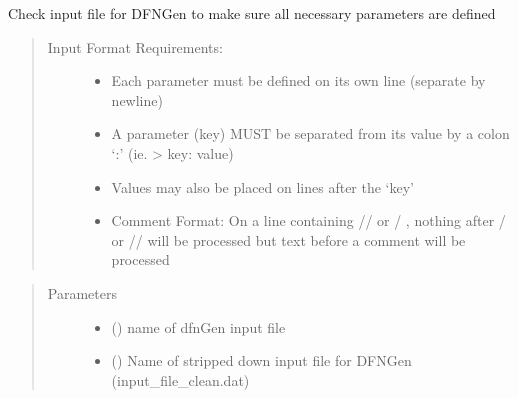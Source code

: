 \documentclass[letterpaper,10pt,english]{sphinxmanual}
\begin{document}
\begin{fulllineitems}

\begin{fulllineitems}
\label{\detokenize{pydfnworks:pydfnworks.general.dfnworks.DFNWORKS.check_input}}
Check input file for DFNGen to make sure all necessary parameters are defined
\begin{quote}
\begin{description}
\item[{Input Format Requirements:}] \leavevmode\begin{itemize}
\item {} 
Each parameter must be defined on its own line (separate by newline)

\item {} 
A parameter (key) MUST be separated from its value by a colon ‘:’ (ie. \textendash{}\textgreater{} key: value)

\item {} 
Values may also be placed on lines after the ‘key’

\item {} 
Comment Format:  On a line containing  // or / \sphinxcode{\sphinxupquote{*}}, nothing after \sphinxcode{\sphinxupquote{*}} / or // will be processed  but text before a comment will be processed

\end{itemize}

\end{description}
\end{quote}
\begin{quote}\begin{description}
\item[{Parameters}] \leavevmode\begin{itemize}
\item {} 
 () \textendash{} name of dfnGen input file

\item {} 
 () \textendash{} Name of stripped down input file for DFNGen (input\_file\_clean.dat)

\end{itemize}


\end{description}
\end{quote}
\end{fulllineitems}
\end{fulllineitems}
\end{document}
